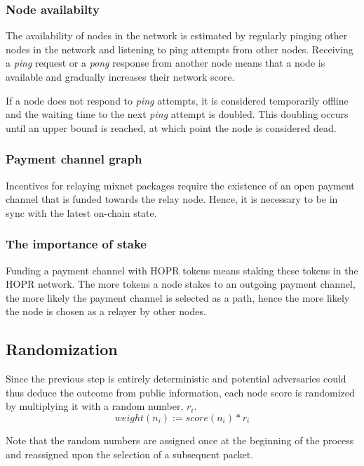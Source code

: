 \subsubsection{Node availabilty}

The availability of nodes in the network is estimated by regularly pinging other nodes in the network and listening to ping attempts from other nodes. Receiving a \textit{ping} request or a \textit{pong} response from another node means that a node is available and gradually increases their network score.

If a node does not respond to \textit{ping} attempts, it is considered temporarily offline and the waiting time to the next \textit{ping} attempt is doubled. This doubling occurs until an upper bound is reached, at which point the node is considered dead.

\subsubsection{Payment channel graph}

Incentives for relaying mixnet packages require the existence of an open payment channel that is funded towards the relay node. Hence, it is necessary to be in sync with the latest on-chain state.

\subsubsection{The importance of stake}

Funding a payment channel with HOPR tokens means staking these tokens in the HOPR network. The more tokens a node stakes to an outgoing payment channel, the more likely the payment channel is selected as a path, hence the more likely the node is chosen as a relayer by other nodes.

\subsection{Randomization}
\label{sec:path-selection:randomization}

Since the previous step is entirely deterministic and potential adversaries could thus deduce the outcome from public information, each node score is randomized by multiplying it with a random number, $r_i$.
$$weight(n_i) := score(n_i) * r_i$$

Note that the random numbers are assigned once at the beginning of the process and reassigned upon the selection of a subsequent packet.

